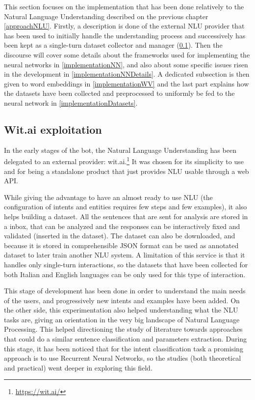 This section focuses on the implementation that has been done relatively to the Natural Language Understanding described on the previous chapter \ref{approachNLU}. Firstly, a description is done of the external NLU provider that has been used to initially handle the understanding process and successively has been kept as a single-turn dataset collector and manager (\ref{implementationWit}). Then the discourse will cover some details about the frameworks used for implementing the neural networks in \ref{implementationNN}, and also about some specific issues risen in the development in \ref{implementationNNDetails}. A dedicated subsection is then given to word embeddings in \ref{implementationWV} and the last part explains how the datasets have been collected and preprocessed to uniformly be fed to the neural network in \ref{implementationDatasets}.

\subsection{Wit.ai exploitation}
\label{implementationWit}

In the early stages of the bot, the Natural Language Understanding has been delegated to an external provider: wit.ai.\footnote{\url{https://wit.ai/}} It was chosen for its simplicity to use and for being a standalone product that just provides NLU usable through a web API.

While giving the advantage to have an almost ready to use NLU (the configuration of intents and entities requires few steps and few examples), it also helps building a dataset. All the sentences that are sent for analysis are stored in a inbox, that can be analyzed and the responses can be interactively fixed and validated (inserted in the dataset). The dataset can also be downloaded, and because it is stored in comprehensible JSON format can be used as annotated dataset to later train another NLU system. A limitation of this service is that it handles only single-turn interactions, so the datasets that have been collected for both Italian and English languages can be only used for this type of interaction.

This stage of development has been done in order to understand the main needs of the users, and progressively new intents and examples have been added. On the other side, this experimentation also helped understanding what the NLU tasks are, giving an orientation in the very big landscape of Natural Language Processing. This helped directioning the study of literature towards approaches that could do a similar sentence classification and parameters extraction. During this stage, it has been noticed that for the intent classification task a promising approach is to use Recurrent Neural Networks, so the studies (both theoretical and practical) went deeper in exploring this field.

